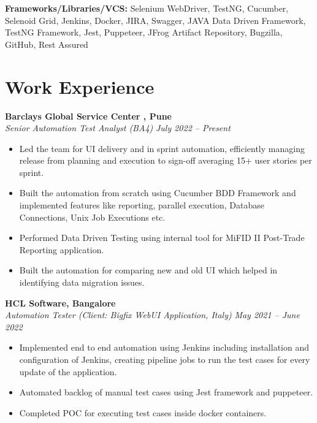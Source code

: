 \documentclass[margin,line]{resume}
\begin{document}
\begin{resume}
      \textbf{Frameworks/Libraries/VCS:} Selenium WebDriver, TestNG, Cucumber, Selenoid Grid, Jenkins, Docker, JIRA, Swagger, JAVA Data Driven Framework, TestNG Framework, Jest, Puppeteer, JFrog Artifact Repository, Bugzilla, GitHub, Rest Assured
 
    \section{\mysidestyle Work Experience}
    \textbf{Barclays Global Service Center , Pune}\\
        \textsl{Senior Automation Test Analyst (BA4)} \hfill \textsl{July 2022 -- Present}\vspace{0mm}
        
        \begin{itemize}
            \item Led the team for UI delivery and in sprint automation, efficiently managing release from planning and execution to sign-off averaging 15+ user stories per sprint. %
            \item Built the automation from scratch using Cucumber BDD Framework and implemented features like reporting, parallel execution, Database Connections, Unix Job Executions etc.
            \item Performed Data Driven Testing using internal tool for MiFID II Post-Trade Reporting application.
            \item Built the automation for comparing new and old UI which helped in identifying data migration issues.
        \end{itemize}
    \textbf{HCL Software, Bangalore}\\
           \textsl{Automation Tester (Client: Bigfix WebUI Application, Italy)} \hfill \textsl{May 2021 -- June 2022} \vspace{1mm}%
    \begin{itemize}
            \item Implemented end to end automation using Jenkins including installation and configuration of Jenkins, creating pipeline jobs to run the test cases for every update of the application.
            \item Automated backlog of manual test cases using Jest framework and puppeteer.
           \item Completed POC for executing test cases inside docker containers.
        \end{itemize}


\end{resume}
\end{document}
